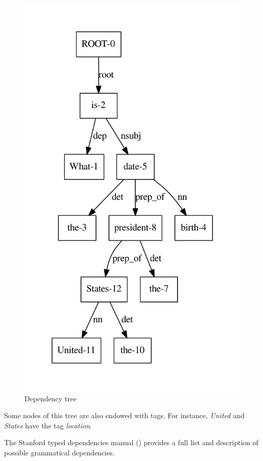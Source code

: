 \begin{figure}
  \centering
  \caption{Dependency tree}
  \label{tree_one}
    \includegraphics[scale=0.6]{../examples_NLP_classical/tree1.pdf}
\end{figure}

Some nodes of this tree are also endowed with tags. For instance, \emph{United} and \emph{States} have the tag \emph{location}.

The Stanford typed dependencies manual (\cite{stanfordDep}) provides a full list and description of possible grammatical dependencies.


